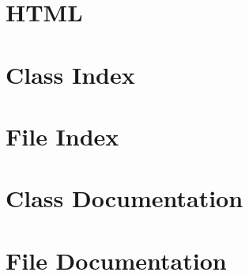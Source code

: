 \documentclass[twoside]{article}
\newcommand{\+}{\discretionary{\mbox{\scriptsize$\hookleftarrow$}}{}{}}
\begin{document}
\section{H\+T\+M\+L}
\label{HTML}
\hypertarget{HTML}{}

\section{Class Index}

\section{File Index}

\section{Class Documentation}



\section{File Documentation}







\newpage
{}
{}
\printindex
\end{document}
